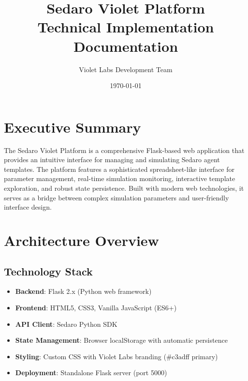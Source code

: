 \documentclass[12pt,a4paper]{article}
\begin{document}
\title{\Huge\textbf{Sedaro Violet Platform}\\\large Technical Implementation Documentation}
\author{Violet Labs Development Team}
\date{\today}
\maketitle

\tableofcontents
\newpage

\section{Executive Summary}

The Sedaro Violet Platform is a comprehensive Flask-based web application that provides an intuitive interface for managing and simulating Sedaro agent templates. The platform features a sophisticated spreadsheet-like interface for parameter management, real-time simulation monitoring, interactive template exploration, and robust state persistence. Built with modern web technologies, it serves as a bridge between complex simulation parameters and user-friendly interface design.

\section{Architecture Overview}

\subsection{Technology Stack}
\begin{itemize}
    \item \textbf{Backend}: Flask 2.x (Python web framework)
    \item \textbf{Frontend}: HTML5, CSS3, Vanilla JavaScript (ES6+)
    \item \textbf{API Client}: Sedaro Python SDK
    \item \textbf{State Management}: Browser localStorage with automatic persistence
    \item \textbf{Styling}: Custom CSS with Violet Labs branding (\#c3adff primary)
    \item \textbf{Deployment}: Standalone Flask server (port 5000)
\end{itemize}
\end{document}

